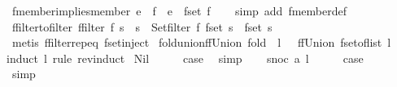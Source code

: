 \begin{isabellebody}
\endisatagproof
{\isafoldproof}%
%
\isadelimproof
\isanewline
%
\endisadelimproof
\isanewline
{}\isamarkupfalse%
\ fmember{\isacharunderscore}implies{\isacharunderscore}member{\isacharcolon}\ {\isachardoublequoteopen}e\ {\isacharbar}{\isasymin}{\isacharbar}\ f\ {\isasymLongrightarrow}\ e\ {\isasymin}\ fset\ f{\isachardoublequoteclose}\isanewline
%
\isadelimproof
\ \ %
\endisadelimproof
%
\isatagproof
{}\isamarkupfalse%
\ {\isacharparenleft}simp\ add{\isacharcolon}\ fmember{\isacharunderscore}def{\isacharparenright}%
\endisatagproof
{\isafoldproof}%
%
\isadelimproof
\isanewline
%
\endisadelimproof
\isanewline
{}\isamarkupfalse%
\ ffilter{\isacharunderscore}to{\isacharunderscore}filter{\isacharcolon}\ {\isachardoublequoteopen}{\isacharparenleft}ffilter\ f\ s\ {\isacharequal}\ s{\isacharprime}{\isacharparenright}\ {\isacharequal}\ {\isacharparenleft}Set{\isachardot}filter\ f\ {\isacharparenleft}fset\ s{\isacharparenright}\ {\isacharequal}\ fset\ s{\isacharprime}{\isacharparenright}{\isachardoublequoteclose}\isanewline
%
\isadelimproof
\ \ %
\endisadelimproof
%
\isatagproof
{}\isamarkupfalse%
\ {\isacharparenleft}metis\ ffilter{\isachardot}rep{\isacharunderscore}eq\ fset{\isacharunderscore}inject{\isacharparenright}%
\endisatagproof
{\isafoldproof}%
%
\isadelimproof
\isanewline
%
\endisadelimproof
\isanewline
{}\isamarkupfalse%
\ fold{\isacharunderscore}union{\isacharunderscore}ffUnion{\isacharcolon}\ {\isachardoublequoteopen}fold\ {\isacharparenleft}{\isacharbar}{\isasymunion}{\isacharbar}{\isacharparenright}\ l\ {\isacharbraceleft}{\isacharbar}{\isacharbar}{\isacharbraceright}\ {\isacharequal}\ ffUnion\ {\isacharparenleft}fset{\isacharunderscore}of{\isacharunderscore}list\ l{\isacharparenright}{\isachardoublequoteclose}\isanewline
%
\isadelimproof
%
\endisadelimproof
%
\isatagproof
{}\isamarkupfalse%
{\isacharparenleft}induct\ l\ rule{\isacharcolon}\ rev{\isacharunderscore}induct{\isacharparenright}\isanewline
{}\isamarkupfalse%
\ Nil\isanewline
\ \ \isamarkupfalse%
\ \isamarkupfalse%
\ {\isacharquery}case\ \isamarkupfalse%
\ simp\isanewline
{}\isamarkupfalse%
\isanewline
\ \ \isamarkupfalse%
\ {\isacharparenleft}snoc\ a\ l{\isacharparenright}\isanewline
\ \ \isamarkupfalse%
\ \isamarkupfalse%
\ {\isacharquery}case\isanewline
\ \ \ \ \isamarkupfalse%
\ simp\isanewline
{}\isamarkupfalse%
%
\endisatagproof
{\isafoldproof}%

\end{isabellebody}
